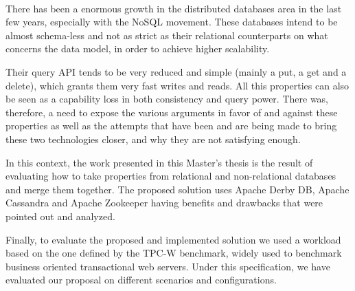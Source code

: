 
\paragraph{}

There has been a enormous growth in the distributed databases area in the last few years, especially with the NoSQL movement. These databases intend to be almost schema-less and not as strict as their relational counterparts on what concerns the data model, in order to achieve higher scalability. 

Their query API tends to be very reduced and simple (mainly a put, a get and a delete), which grants them very fast writes and reads. All this properties can also be seen as a capability loss in both consistency and query power. There was, therefore, a need to expose the various arguments in favor of and against these properties as well as the attempts that have been and are being made to bring these two technologies closer, and why they are not satisfying enough.

In this context, the work presented in this Master's thesis is the result of evaluating how to take properties from relational and non-relational databases and merge them together. The proposed solution uses Apache Derby DB, Apache Cassandra and Apache Zookeeper having benefits and drawbacks that were pointed out and analyzed.

Finally, to evaluate the proposed and implemented solution we used a workload based on the one defined by the TPC-W benchmark, widely used to benchmark business oriented transactional web servers. Under this specification, we have evaluated our proposal on different scenarios and configurations.
